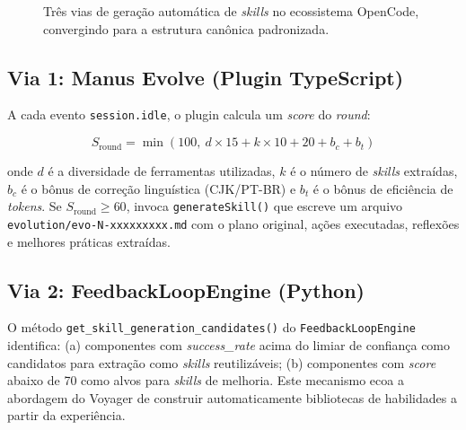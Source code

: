 \documentclass[
  article,
  12pt,
  oneside,
  a4paper,
  brazil,
  sumario=tradicional
]{abntex2}
\begin{document}
\begin{figure}[H]
  \caption{Três vias de geração automática de \emph{skills} no ecossistema OpenCode, convergindo para a estrutura canônica padronizada.}
  \label{fig:skillgen}
\end{figure}

\subsection{Via 1: Manus Evolve (Plugin TypeScript)}

A cada evento \texttt{session.idle}, o plugin calcula um \emph{score} do \emph{round}:

\begin{equation}
S_{\text{round}} = \min(100,\ d \times 15 + k \times 10 + 20 + b_c + b_t)
\end{equation}

onde $d$ é a diversidade de ferramentas utilizadas, $k$ é o número de \emph{skills} extraídas, $b_c$ é o bônus de correção linguística (CJK/PT-BR) e $b_t$ é o bônus de eficiência de \emph{tokens}. Se $S_{\text{round}} \geq 60$, invoca \texttt{generateSkill()} que escreve um arquivo \texttt{evolution/evo-N-xxxxxxxxx.md} com o plano original, ações executadas, reflexões e melhores práticas extraídas.

\subsection{Via 2: FeedbackLoopEngine (Python)}

O método \texttt{get\_skill\_generation\_candidates()} do \texttt{FeedbackLoopEngine} identifica: (a) componentes com \emph{success\_rate} acima do limiar de confiança como candidatos para extração como \emph{skills} reutilizáveis; (b) componentes com \emph{score} abaixo de 70 como alvos para \emph{skills} de melhoria. Este mecanismo ecoa a abordagem do Voyager \cite{wang2023voyager} de construir automaticamente bibliotecas de habilidades a partir da experiência.
\end{document}
